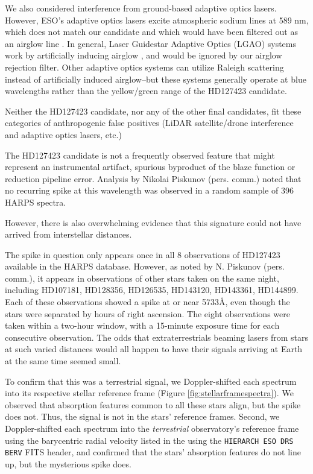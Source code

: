 \documentclass[twocolumn]{aastex701}
\begin{document}
We also considered interference from ground-based adaptive optics lasers. However, ESO's adaptive optics lasers excite atmospheric sodium lines at 589 nm, which does not match our candidate and which would have been filtered out as an airglow line \citep{HARPS_guidestars}. In general, Laser Guidestar Adaptive Optics (LGAO) systems work by artificially inducing airglow \citep{LaserGuideStarAdaptiveOptics}, and would be ignored by our airglow rejection filter.  Other adaptive optics systems can utilize Raleigh scattering instead of artificially induced airglow--but these systems generally operate at blue wavelengths \citep{RaleighScattering} rather than the yellow/green range of the HD127423 candidate.

Neither the HD127423 candidate, nor any of the other final candidates, fit these categories of anthropogenic false positives (LiDAR satellite/drone interference and adaptive optics lasers, etc.)

The HD127423 candidate is not a frequently observed feature that might represent an instrumental artifact, spurious byproduct of the blaze function or reduction pipeline error. Analysis by Nikolai Piskunov (pers. comm.) noted that no recurring spike at this wavelength was observed in a random sample of 396 HARPS spectra. 

However, there is also overwhelming evidence that this signature could not have arrived from interstellar distances.  

The spike in question only appears once in all 8 observations of HD127423 available in the HARPS database.  However, as noted by N. Piskunov (pers. comm.), it appears in observations of other stars taken on the same night, including HD107181, HD128356, HD126535, HD143120, HD143361, HD144899.  Each of these observations showed a spike at or near 5733\AA, even though the stars were separated by hours of right ascension. The eight observations were taken within a two-hour window, with a 15-minute exposure time for each consecutive observation. The odds that extraterrestrials beaming lasers from stars at such varied distances would all happen to have their signals arriving at Earth at the same time seemed small. 

To confirm that this was a terrestrial signal, we Doppler-shifted each spectrum into its respective stellar reference frame (Figure \ref{fig:stellarframespectra}).  We observed that absorption features common to all these stars align, but the spike does not. Thus, the signal is not in the stars' reference frames.  Second, we Doppler-shifted each spectrum into the {\em terrestrial} observatory's reference frame using the barycentric radial velocity listed in the using the \texttt{HIERARCH ESO DRS BERV} FITS header, and confirmed that the stars' absorption features do not line up, but the mysterious spike does.
\end{document}
